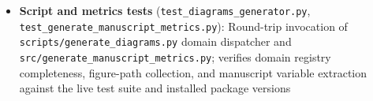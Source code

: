 \documentclass[
]{article}
\begin{document}
\begin{itemize}
  rendering pipelines and syntactic panel coverage paths not hit by
  per-module visualization tests; verifies that all registered plot
  functions execute to file without exception
\item
  \textbf{Script and metrics tests}
  (\texttt{test\_diagrams\_generator.py},
  \texttt{test\_generate\_manuscript\_metrics.py}): Round-trip
  invocation of \texttt{scripts/generate\_diagrams.py} domain dispatcher
  and \texttt{src/generate\_manuscript\_metrics.py}; verifies domain
  registry completeness, figure-path collection, and manuscript variable
  extraction against the live test suite and installed package versions
\end{itemize}

\newpage



\clearpage


\end{document}
